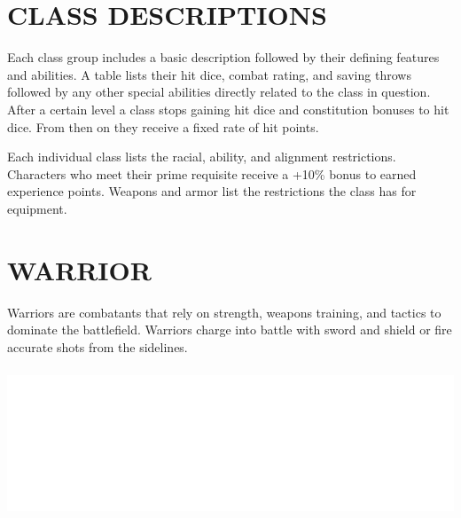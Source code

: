 \begin{multicols}{2}
\begin{minipage}{\columnwidth}
\end{minipage}

\section{CLASS DESCRIPTIONS}

Each class group includes a basic description followed by their defining features and abilities.  A table lists their hit dice, combat rating, and saving throws followed by any other special abilities directly related to the class in question.  After a certain level a class stops gaining hit dice and constitution bonuses to hit dice.  From then on they receive a fixed rate of hit points.  

Each individual class lists the racial, ability, and alignment restrictions.  Characters who meet their prime requisite receive a +10\% bonus to earned experience points.  Weapons and armor list the restrictions the class has for equipment. 

 
\section{WARRIOR}

Warriors are combatants that rely on strength, weapons training, and tactics to dominate the battlefield.  Warriors charge into battle with sword and shield or fire accurate shots from the sidelines.  

\noindent\includegraphics[width=\columnwidth, height=1.75in]{testblock.pdf}  

\end{multicols}


